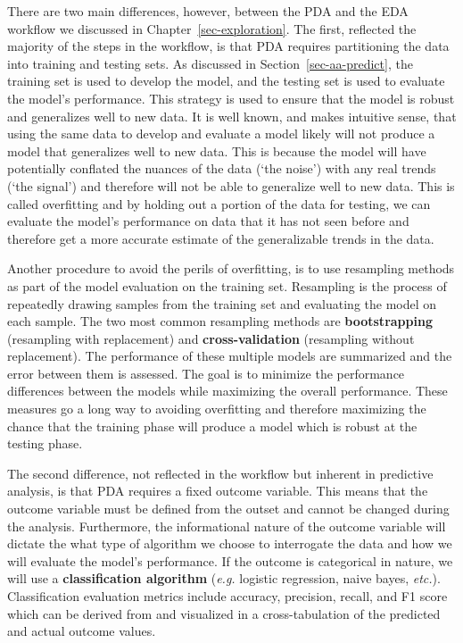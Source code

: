 \documentclass[
  letterpaper,
  DIV=11,
  numbers=noendperiod]{scrreprt}
\theoremstyle{definition}
\theoremstyle{remark}
\begin{document}
There are two main differences, however, between the PDA and the EDA
workflow we discussed in Chapter~\ref{sec-exploration}. The first,
reflected the majority of the steps in the workflow, is that PDA
requires partitioning the data into training and testing sets. As
discussed in Section~\ref{sec-aa-predict}, the training set is used to
develop the model, and the testing set is used to evaluate the model's
performance. This strategy is used to ensure that the model is robust
and generalizes well to new data. It is well known, and makes intuitive
sense, that using the same data to develop and evaluate a model likely
will not produce a model that generalizes well to new data. This is
because the model will have potentially conflated the nuances of the
data (`the noise') with any real trends (`the signal') and therefore
will not be able to generalize well to new data. This is called
overfitting and by holding out a portion of the data for testing, we can
evaluate the model's performance on data that it has not seen before and
therefore get a more accurate estimate of the generalizable trends in
the data.

Another procedure to avoid the perils of overfitting, is to use
resampling methods as part of the model evaluation on the training set.
Resampling is the process of repeatedly drawing samples from the
training set and evaluating the model on each sample. The two most
common resampling methods are \textbf{bootstrapping} (resampling with
replacement) and \textbf{cross-validation} (resampling without
replacement). The performance of these multiple models are summarized
and the error between them is assessed. The goal is to minimize the
performance differences between the models while maximizing the overall
performance. These measures go a long way to avoiding overfitting and
therefore maximizing the chance that the training phase will produce a
model which is robust at the testing phase.

The second difference, not reflected in the workflow but inherent in
predictive analysis, is that PDA requires a fixed outcome variable. This
means that the outcome variable must be defined from the outset and
cannot be changed during the analysis. Furthermore, the informational
nature of the outcome variable will dictate the what type of algorithm
we choose to interrogate the data and how we will evaluate the model's
performance. If the outcome is categorical in nature, we will use a
\textbf{classification algorithm} (\emph{e.g.} logistic regression,
naive bayes, \emph{etc.}). Classification evaluation metrics include
accuracy, precision, recall, and F1 score which can be derived from and
visualized in a cross-tabulation of the predicted and actual outcome
values.
\end{document}
